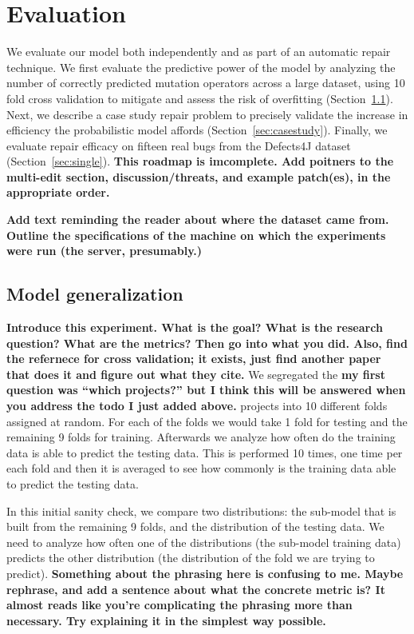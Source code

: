 \documentclass[conference]{IEEEtran}
\newcommand{\todo}[1]
  {{\scriptsize \textbf{\color{red} {#1}}}}
\begin{document}
\section{Evaluation} \label{evaluation}

We evaluate our model both independently and as part of an automatic repair
technique.  We first evaluate the predictive power of the model by analyzing the
number of correctly predicted mutation operators across a large dataset, using 10 fold cross
validation to mitigate and assess the risk of overfitting
(Section~\ref{sec:generalize}).  Next, we describe a case study 
repair problem to precisely validate the increase in efficiency the
probabilistic model affords (Section~\ref{sec:casestudy}).  Finally, we evaluate
repair efficacy on fifteen real bugs from the Defects4J dataset
(Section~\ref{sec:single}).  \todo{This roadmap is imcomplete.  Add poitners to
  the multi-edit section, discussion/threats, and example patch(es), in the
  appropriate order.}

\todo{Add text reminding the reader about where the dataset came from.  Outline
  the specifications of the machine on which the experiments were run (the
  server, presumably.)}

\subsection{Model generalization}
\label{sec:generalize}

\todo{Introduce this experiment.  What is the goal?  What is the research
  question?  What are the metrics?  Then go into what you did.  Also, find the
  refernece for cross validation; it exists, just find another paper that does
  it and figure out what they cite.}
We segregated the\todo{my first question was ``which projects?'' but I think this will be answered when you address the todo I just added above.} projects into 10 
different folds assigned at random. For each of the 
folds we would take 1 fold for testing and the remaining 9 folds for training. 
Afterwards we analyze how often do the training data is able to predict the 
testing data. This is performed 10 times, one time per each fold and then it is 
averaged to see how commonly is the training data able to predict the testing 
data.

In this initial sanity check, we compare two distributions: the sub-model 
that is built from the remaining 9 folds, and the distribution of the testing 
data. We need to analyze how often one of the distributions (the sub-model 
training data) predicts the other distribution (the distribution of the fold we 
are trying to predict). \todo{Something about the phrasing here is confusing to
  me.  Maybe rephrase, and add a sentence about what the concrete metric is?  It
  almost reads like you're complicating the phrasing more than necessary.  Try
  explaining it in the simplest way possible.}
\end{document}
